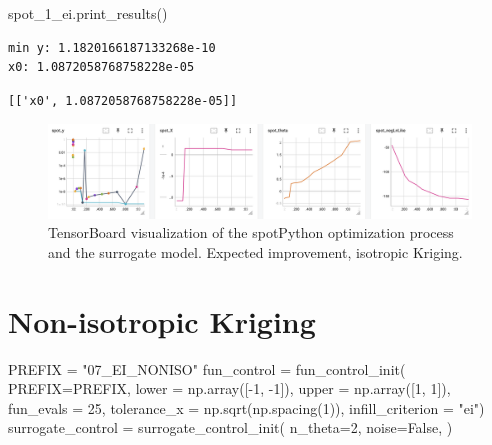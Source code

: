 \documentclass[
  letterpaper,
  DIV=11,
  numbers=noendperiod]{scrreprt}
\newenvironment{Shaded}{\begin{snugshade}}{\end{snugshade}}
\newcommand{\DecValTok}[1]{\textcolor[rgb]{0.68,0.00,0.00}{#1}}
\newcommand{\NormalTok}[1]{\textcolor[rgb]{0.00,0.23,0.31}{#1}}
\newcommand{\OperatorTok}[1]{\textcolor[rgb]{0.37,0.37,0.37}{#1}}
\newcommand{\StringTok}[1]{\textcolor[rgb]{0.13,0.47,0.30}{#1}}
\newcommand{\VariableTok}[1]{\textcolor[rgb]{0.07,0.07,0.07}{#1}}
\begin{document}
\begin{Shaded}
\begin{Highlighting}[]
\NormalTok{spot\_1\_ei.print\_results()}
\end{Highlighting}
\end{Shaded}

\begin{verbatim}
min y: 1.1820166187133268e-10
x0: 1.0872058768758228e-05
\end{verbatim}

\begin{verbatim}
[['x0', 1.0872058768758228e-05]]
\end{verbatim}

\begin{figure}[H]

{\centering \includegraphics[width=1\textwidth,height=\textheight]{figures_static/07_tensorboard_EI_ISO.png}

}

\caption{TensorBoard visualization of the spotPython optimization
process and the surrogate model. Expected improvement, isotropic
Kriging.}

\end{figure}%

\section{Non-isotropic Kriging}\label{non-isotropic-kriging}

\begin{Shaded}
\begin{Highlighting}[]
\NormalTok{PREFIX }\OperatorTok{=} \StringTok{"07\_EI\_NONISO"}
\NormalTok{fun\_control }\OperatorTok{=}\NormalTok{ fun\_control\_init(}
\NormalTok{    PREFIX}\OperatorTok{=}\NormalTok{PREFIX,}
\NormalTok{    lower }\OperatorTok{=}\NormalTok{ np.array([}\OperatorTok{{-}}\DecValTok{1}\NormalTok{, }\OperatorTok{{-}}\DecValTok{1}\NormalTok{]),}
\NormalTok{    upper }\OperatorTok{=}\NormalTok{ np.array([}\DecValTok{1}\NormalTok{, }\DecValTok{1}\NormalTok{]),}
\NormalTok{    fun\_evals }\OperatorTok{=} \DecValTok{25}\NormalTok{,}
\NormalTok{    tolerance\_x }\OperatorTok{=}\NormalTok{ np.sqrt(np.spacing(}\DecValTok{1}\NormalTok{)),}
\NormalTok{    infill\_criterion }\OperatorTok{=} \StringTok{"ei"}\NormalTok{)}
\NormalTok{surrogate\_control }\OperatorTok{=}\NormalTok{ surrogate\_control\_init(}
\NormalTok{    n\_theta}\OperatorTok{=}\DecValTok{2}\NormalTok{,}
\NormalTok{    noise}\OperatorTok{=}\VariableTok{False}\NormalTok{,}
\NormalTok{    )}
\end{Highlighting}
\end{Shaded}
\end{document}
